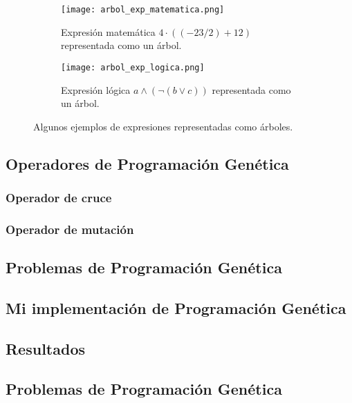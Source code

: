 \begin{figure}[H]
    \centering
	 \begin{subfigure}[b]{0.49\textwidth}
		 \centering
		 \texttt{[image: arbol\_exp\_matematica.png]}
		 \caption{Expresión matemática $4 \cdot ( (-23 / 2) + 12)$ representada como un árbol.}
		 \label{fig:exp_matematica}
	 \end{subfigure}
	 \begin{subfigure}[b]{0.49\textwidth}
		 \centering
		\texttt{[image: arbol\_exp\_logica.png]}
		\caption{Expresión lógica $ a \wedge (\neg (b \vee c) ) $ representada como un árbol.}
		\label{fig:exp_logica}
   \end{subfigure}
	\caption{Algunos ejemplos de expresiones representadas como árboles.}
	\label{fig:arbol_exp}
\end{figure}

\subsection{Operadores de Programación Genética}

\subsubsection{Operador de cruce}

\subsubsection{Operador de mutación}


\subsection{Problemas de Programación Genética}

\subsection{Mi implementación de Programación Genética}

\subsection{Resultados}

\subsection{Problemas de Programación Genética}
